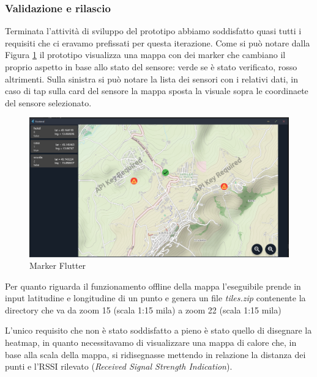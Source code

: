 \documentclass[a4paper]{article}
\begin{document}
\subsubsection*{{Validazione e rilascio}}
Terminata l'attività di sviluppo del prototipo abbiamo soddisfatto quasi tutti i requisiti che ci eravamo prefissati per questa iterazione. Come si può notare dalla Figura \ref{marker_flutter} il prototipo visualizza una mappa con dei marker che cambiano il proprio aspetto in base allo stato del sensore: verde se è stato verificato, rosso altrimenti. Sulla sinistra si può notare la lista dei sensori con i relativi dati, in caso di tap sulla card del sensore la mappa sposta la visuale sopra le coordinaete del sensore selezionato. 
\begin{figure}[tbp]
    \centering
    \includegraphics[width=\textwidth]{figure/marker_flutter.png}
    \caption{Marker Flutter}
    \label{marker_flutter}
\end{figure}

Per quanto riguarda il funzionamento offline della mappa l'eseguibile prende in input latitudine e longitudine di un punto e genera un file \textit{tiles.zip} contenente la directory
\setnewpathsep{/}  che va da zoom 15 (scala 1:15 mila) a zoom 22 (scala 1:15 mila) 


L'unico requisito che non è stato soddisfatto a pieno è stato quello di disegnare la heatmap, in quanto necessitavamo di visualizzare una mappa di calore che, in base alla scala della mappa, si ridisegnasse mettendo in relazione la distanza dei punti e l'RSSI rilevato (\textit{Received Signal Strength Indication}).
\end{document}
